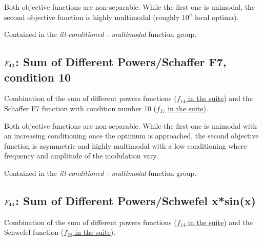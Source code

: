 Both objective functions are non-separable. While the first one
is unimodal, the second objective
function is highly multimodal (roughly \(10^n\) local optima).

Contained in the \emph{ill-conditioned - multimodal} function group.



\subsection[\texorpdfstring{\protect\(F_{43}\protect\): Sum of Different Powers/Schaffer F7, condition 10}{F43: Sum of Different Powers/Schaffer F7, condition 10}]{\texorpdfstring{\protect\(F_{43}\protect\): Sum of Different Powers/Schaffer F7, condition 10}{}}
\label{index:sum-of-different-powers-schaffer-f7-condition-10}\label{index:f43}
Combination of the sum of different powers functions
(\href{https://coco.gforge.inria.fr/downloads/download16.00/bbobdocfunctions.pdf\#page=70}{\(f_{14}\) in the \bbob suite}) and the Schaffer F7 function with
condition number 10 (\href{https://coco.gforge.inria.fr/downloads/download16.00/bbobdocfunctions.pdf\#page=85}{\(f_{17}\) in the \bbob suite}).

Both objective functions are non-separable. While the first one
is unimodal with an increasing conditioning once the optimum is approached,
the second objective function is asymmetric and highly multimodal with a
low conditioning where frequency and amplitude of the modulation vary.

Contained in the \emph{ill-conditioned - multimodal} function group.



\subsection[\texorpdfstring{\protect\(F_{44}\protect\): Sum of Different Powers/Schwefel x*sin(x)}{F44: Sum of Different Powers/Schwefel x*sin(x)}]{\texorpdfstring{\protect\(F_{44}\protect\): Sum of Different Powers/Schwefel x*sin(x)}{}}
\label{index:f44}\label{index:sum-of-different-powers-schwefel-x-sin-x}
Combination of the sum of different powers functions
(\href{https://coco.gforge.inria.fr/downloads/download16.00/bbobdocfunctions.pdf\#page=70}{\(f_{14}\) in the \bbob suite}) and the Schwefel function (\href{https://coco.gforge.inria.fr/downloads/download16.00/bbobdocfunctions.pdf\#page=100}{\(f_{20}\) in the \bbob suite}).

